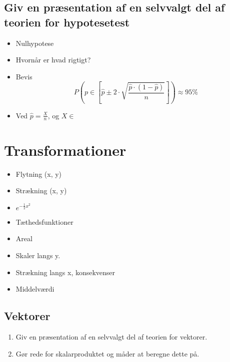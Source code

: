 \documentclass{article}
\begin{document}
\subsection{Giv en præsentation af en selvvalgt del af teorien for hypotesetest}
\begin{itemize}
	\item Nulhypotese
	\item Hvornår er hvad rigtigt?
	\item Bevis
		\[
			P(p\in[\hat p \pm 2\cdot\sqrt{\frac{\hat p\cdot(1-\hat p)}{n}}]) \approx 95\%
		\]
	\item Ved $\hat p = \frac{X}{n}$, og $X \in $
\end{itemize}

\section{Transformationer}
\begin{itemize}
	\item Flytning (x, y)
	\item Strækning (x, y)
	\item $e^{-\frac{1}{2}x^2}$
	\item Tæthedsfunktioner
	\item Areal
	\item Skaler langs y.
	\item Strækning langs x, konsekvenser
	\item Middelværdi
\end{itemize}

\begin{tcolorbox}
	\section{Vektorer}
	\tcblower
	\begin{enumerate}
		\item Giv en præsentation af en selvvalgt del af teorien for vektorer.
		\item Gør rede for skalarproduktet og måder at beregne dette på.
	\end{enumerate}
\end{tcolorbox}
\end{document}
